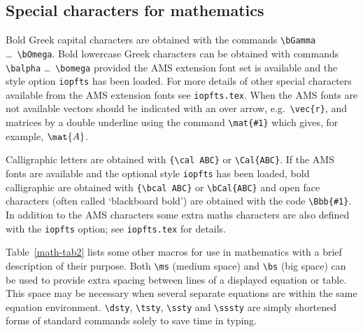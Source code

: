 \subsection{Special characters for mathematics}
Bold Greek capital characters are obtained with the commands
\verb"\bGamma" \dots\ \verb"\bOmega". Bold lowercase Greek characters can
be obtained with commands \verb"\balpha" \dots\ \verb"\bomega"
provided the AMS extension font set is available and the
style option \verb"iopfts" has been loaded. For more details of
other special characters available from the AMS extension fonts
see \verb"iopfts.tex". When the AMS fonts are  not available vectors
should be indicated with an over arrow, e.g.\ \verb"\vec{r}", and matrices
by a double underline using the command \verb"\mat{#1}" which gives, for
example, $\mat{A}$.


Calligraphic letters are obtained with \verb"{\cal ABC}" or
\verb"\Cal{ABC}".
If the AMS fonts are available and the optional style
\verb"iopfts" has been loaded, bold calligraphic
are obtained with \verb"{\bcal ABC}" or
\verb"\bCal{ABC}" and open face characters
(often called `blackboard bold')
are obtained  with the code \verb"\Bbb{#1}".
In addition to the AMS characters some
extra maths characters are also defined with the \verb"iopfts" option; see
\verb"iopfts.tex" for details.

Table~\ref{math-tab2} lists some other macros for use in
mathematics with a brief description of their purpose.
Both \verb"\ms" (medium space) and \verb"\bs" (big space) can be used to
provide extra spacing between lines of a displayed equation or table.
This space may be necessary when several separate equations are within the
same equation environment. \verb"\dsty", \verb"\tsty", \verb"\ssty" and
\verb"\sssty" are simply shortened forms of standard commands solely to
save time in typing.

